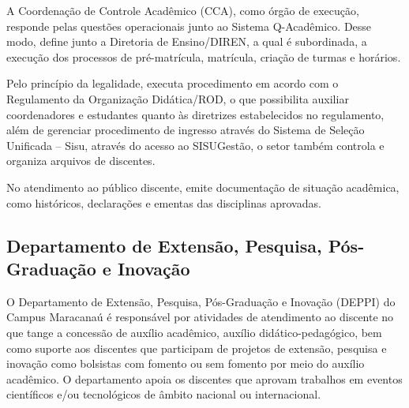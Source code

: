 A Coordenação de Controle Acadêmico (CCA), como órgão de execução, responde pelas questões operacionais junto ao Sistema Q-Acadêmico. Desse modo, define junto a Diretoria de Ensino/DIREN, a qual é subordinada, a execução dos processos de pré-matrícula, matrícula, criação de turmas e horários.

Pelo princípio da legalidade, executa procedimento em acordo com o Regulamento da Organização Didática/ROD, o que possibilita auxiliar coordenadores e estudantes quanto às diretrizes estabelecidos no regulamento, além de gerenciar procedimento de ingresso através do Sistema de Seleção Unificada – Sisu, através do acesso ao SISUGestão, o setor também controla e organiza arquivos de discentes. 

No atendimento ao público discente, emite documentação de situação acadêmica, como históricos, declarações e ementas das disciplinas aprovadas.

\subsection{Departamento de Extensão, Pesquisa, Pós-Graduação e Inovação}


O Departamento de Extensão, Pesquisa, Pós-Graduação e Inovação (DEPPI) do  Campus Maracanaú é responsável por atividades de atendimento ao discente no que tange a concessão de auxílio acadêmico, auxílio didático-pedagógico, bem como suporte aos discentes que participam de projetos de extensão, pesquisa e inovação como bolsistas com fomento ou sem fomento por meio do auxílio acadêmico. O departamento apoia os discentes que aprovam trabalhos em eventos científicos e/ou tecnológicos de âmbito nacional ou internacional. 

